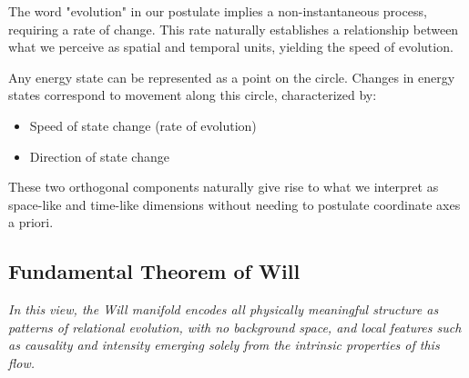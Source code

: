\documentclass{article}
\begin{document}
The word "evolution" in our postulate implies a non-instantaneous process, requiring a rate of change. This rate naturally establishes a relationship between what we perceive as spatial and temporal units, yielding the speed of evolution.

Any energy state can be represented as a point on the circle. Changes in energy states correspond to movement along this circle, characterized by:
\begin{itemize}
    \item Speed of state change (rate of evolution)
    \item Direction of state change
\end{itemize}

These two orthogonal components naturally give rise to what we interpret as space-like and time-like dimensions without needing to postulate coordinate axes a priori.

\subsection{Fundamental Theorem of Will}
\textit{In this view, the Will manifold encodes all physically meaningful structure as patterns of relational evolution, with no background space, and local features such as causality and intensity emerging solely from the intrinsic properties of this flow.}
\end{document}

